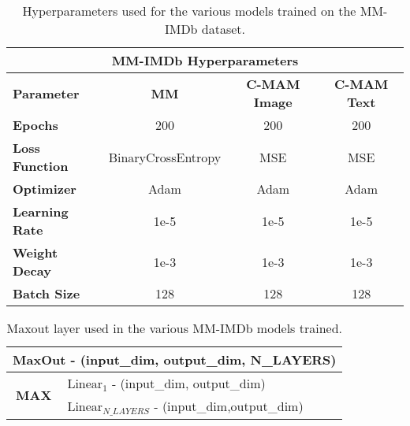 \begin{table}[h!]
\footnotesize

\centering
\caption{Hyperparameters used for the various models trained on the MM-IMDb dataset.}
\label{tab:mmimdb_hypparams}
\begin{tabular}{lccc}
\hline
\multicolumn{4}{c}{\textbf{MM-IMDb Hyperparameters}}             \\ \hline
\multicolumn{1}{l|}{\textbf{Parameter}}     & \textbf{MM}        & \textbf{C-MAM Image} & \textbf{C-MAM Text} \\ \hline
\multicolumn{1}{l|}{\textbf{Epochs}}        & 200  & 200  & 200  \\
\multicolumn{1}{l|}{\textbf{Loss Function}} & BinaryCrossEntropy & MSE                  & MSE                 \\
\multicolumn{1}{l|}{\textbf{Optimizer}}     & Adam & Adam & Adam \\
\multicolumn{1}{l|}{\textbf{Learning Rate}} & 1e-5 & 1e-5 & 1e-5 \\
\multicolumn{1}{l|}{\textbf{Weight Decay}}  & 1e-3 & 1e-3 & 1e-3 \\
\multicolumn{1}{l|}{\textbf{Batch Size}}    & 128  & 128  & 128  \\ \hline
\end{tabular}%
\end{table}

\begin{table}[h!]
    \footnotesize
    \caption{Maxout layer used in the various MM-IMDb models trained.}
    \label{tab:maxout}
    \begin{tabular}{ll}
    \hline
    \multicolumn{2}{c}{\textbf{MaxOut - (input\_dim, output\_dim, N\_LAYERS)}}                             \\ \hline
    \multicolumn{1}{c|}{\multirow{2}{*}{\textbf{MAX}}} & Linear$_1$ - (input\_dim, output\_dim)           \\ \cline{2-2} 
    \multicolumn{1}{c|}{}                              & Linear$_{N\_LAYERS}$ - (input\_dim,output\_dim) \\ \hline
    \end{tabular}
\end{table}

